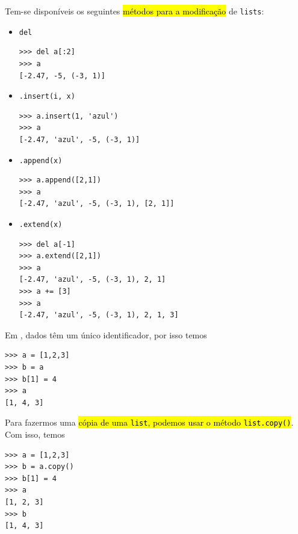 Tem-se disponíveis os seguintes \hl{métodos para a modificação} de \lstinline+lists+:
\begin{itemize}
\item \lstinline+del+ 

\begin{lstlisting}[framexrightmargin=-2.5em]
>>> del a[:2]
>>> a
[-2.47, -5, (-3, 1)]
\end{lstlisting}

\item \lstinline+.insert(i, x)+ 

\begin{lstlisting}[framexrightmargin=-2.5em]
>>> a.insert(1, 'azul')
>>> a
[-2.47, 'azul', -5, (-3, 1)]
\end{lstlisting}

\item \lstinline+.append(x)+ 

\begin{lstlisting}[framexrightmargin=-2.5em]
>>> a.append([2,1])
>>> a
[-2.47, 'azul', -5, (-3, 1), [2, 1]]
\end{lstlisting}

\item \lstinline+.extend(x)+ 

\begin{lstlisting}[framexrightmargin=-2.5em]
>>> del a[-1]
>>> a.extend([2,1])
>>> a
[-2.47, 'azul', -5, (-3, 1), 2, 1]
>>> a += [3]
>>> a
[-2.47, 'azul', -5, (-3, 1), 2, 1, 3]
\end{lstlisting}

\end{itemize}

\begin{obs}
  Em {\python}, dados têm um único identificador, por isso temos

\begin{lstlisting}
>>> a = [1,2,3]
>>> b = a
>>> b[1] = 4
>>> a
[1, 4, 3]
\end{lstlisting}

Para fazermos uma \hl{cópia de uma \texttt{list}, podemos usar o método \texttt{list.copy()}}. Com isso, temos

\begin{lstlisting}
>>> a = [1,2,3]
>>> b = a.copy()
>>> b[1] = 4
>>> a
[1, 2, 3]
>>> b
[1, 4, 3]
\end{lstlisting}

\end{obs}

